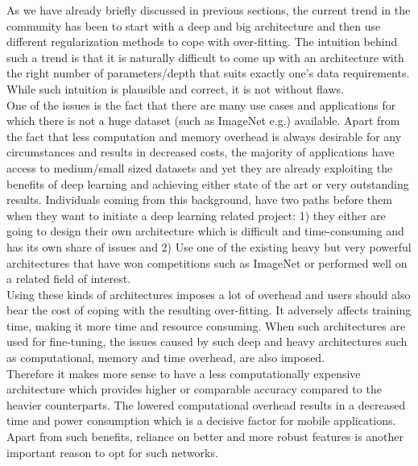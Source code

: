 \documentclass{article} \usepackage{lets_keepit_simple,times}
\begin{document}
As we have already briefly discussed in previous sections, the current trend in the community has been to start with a deep and big architecture and then use different regularization methods to cope with over-fitting. The intuition behind such a trend is that it is naturally difficult to come up with an architecture with the right number of parameters/depth that suits exactly one's data requirements. While such intuition is plausible and correct, it is not without flaws.\\
One of the issues is the fact that there are many use cases and applications for which there is not a huge dataset (such as ImageNet e.g.) available. Apart from the fact that less computation and memory overhead is always desirable for any circumstances and results in decreased costs, the majority of applications have access to medium/small sized datasets and yet they are already exploiting the benefits of deep learning and achieving either state of the art or very outstanding results. Individuals coming from this background, have two paths before them when they want to initiate a deep learning related project: 1) they either are going to design their own architecture which is difficult and time-consuming and has its own share of issues and 2) Use one of the existing heavy but very powerful architectures that have won competitions such as ImageNet or performed well on a related field of interest.\\
Using these kinds of architectures imposes a lot of overhead and users should also bear the cost of coping with the resulting over-fitting. It adversely affects training time, making it more time and resource consuming. When such architectures are used for fine-tuning, the issues caused by such deep and heavy architectures such as computational, memory and time overhead, are also imposed.\\ 
Therefore it makes more sense to have a less computationally expensive architecture which provides higher or comparable accuracy compared to the heavier counterparts. The lowered computational overhead results in a decreased time and power consumption which is a decisive factor for mobile applications. Apart from such benefits, reliance on better and more robust features is another important reason to opt for such networks.
\end{document}
